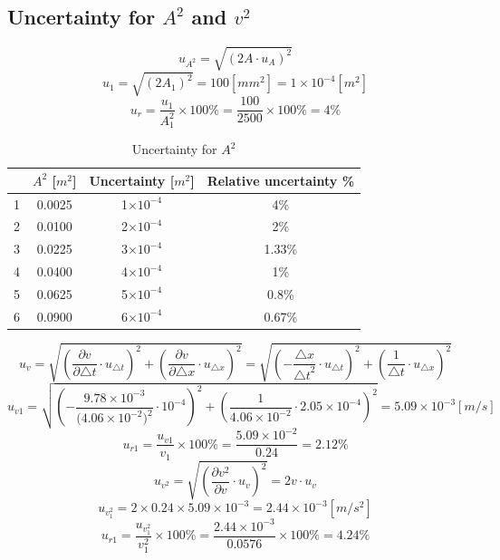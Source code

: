 \documentclass[12pt]{article}
\begin{document}
\subsection{Uncertainty for $A^2$ and $v^2$}
$$u_{A^2}=\sqrt{(2A\cdot{u_A})^2}$$
$$u_1=\sqrt{(2A_1)^2}=100[mm^2]=1\times{10^{-4}}[m^2]$$
$$u_r=\frac{u_1}{A_1^2}\times100\%=\frac{100}{2500}\times100\%=4\%$$
\begin{table}[H]
\centering
\begin{tabular}{|c|c|c|c|}
\hline
  & $A^2$ [$m^2$]   & Uncertainty [$m^2$] & Relative uncertainty \% \\ \hline
1 & 0.0025 & 1$\times10^{-4}$              & 4\%                     \\ \hline
2 & 0.0100     & 2$\times10^{-4}$        &   2\%                      \\ \hline
3 & 0.0225     & 3$\times10^{-4}$                 &  1.33\%                       \\ \hline
4 & 0.0400     & 4$\times10^{-4}$                 &    1\%                     \\ \hline
5 & 0.0625     & 5$\times10^{-4}$                 &    0.8\%                     \\ \hline
6 & 0.0900     & 6$\times10^{-4}$                 &    0.67\%                     \\ \hline
\end{tabular}
\caption{Uncertainty for $A^2$}
\end{table}
$$u_v=\sqrt{(\frac{\partial{v}}{\partial{\bigtriangleup{t}}}\cdot{u_{\bigtriangleup{t}}})^2+(\frac{\partial{v}}{\partial{\bigtriangleup{x}}}\cdot{u_{\bigtriangleup{x}}})^2}=\sqrt{(-\frac{\bigtriangleup{x}}{{\bigtriangleup{t}}^2}\cdot{u_{\bigtriangleup{t}}})^2+(\frac{1}{\bigtriangleup{t}}\cdot{u_{\bigtriangleup{x}}})^2}$$
$$u_{v1}=\sqrt{(-\frac{9.78\times10^{-3}}{{(4.06\times{10^{-2}}})^2}\cdot{10^{-4}})^2+(\frac{1}{4.06\times{10^{-2}}}\cdot{2.05\times10^{-4}})^2}=5.09\times{10^{-3}}[m/s]$$
$$u_{r1}=\frac{u_{v1}}{v_1}\times{100\%}=\frac{5.09\times{10^{-2}}}{0.24}=2.12\%$$
$$u_{v^2}=\sqrt{(\frac{\partial{v^2}}{\partial{v}}\cdot{u_v})^2}=2v\cdot{u_v}$$
$$u_{v_1^2}=2\times0.24\times5.09\times10^{-3}=2.44\times10^{-3}[m/s^2]$$
$$u_{r1}=\frac{u_{v_1^2}}{v_1^2}\times100\%=\frac{2.44\times10^{-3}}{0.0576}\times100\%=4.24\%$$
\end{document}

